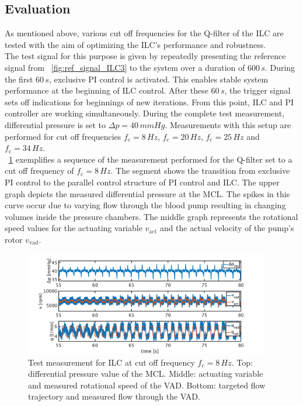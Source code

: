 \subsection{Evaluation}
As mentioned above, various cut off frequencies for the Q-filter of the ILC are tested with the aim of optimizing the ILC's performance and robustness.  \\The test signal for this purpose is given by repeatedly presenting the reference signal from \figurename~\ref{fig:ref_signal_ILC3} to the system over a duration of $600\,s$. During the first $60\,s$, exclusive PI control is activated. This enables stable system performance at the beginning of ILC control. After these $60\,s$, the trigger signal sets off indications for beginnings of new iterations. From this point, ILC and PI controller are working simultaneously. During the complete test measurement, differential pressure is set to $\Delta{p}=40\,mmHg$. Measurements with this setup are performed for cut off frequencies $f_{\mathrm{c}}=8\,Hz$, $f_{\mathrm{c}}=20\,Hz$, $f_{\mathrm{c}}=25\,Hz$ and $f_{\mathrm{c}}=34\,Hz$.
\\\figurename~\ref{fig:pi_to_ilc} exemplifies a sequence of the measurement performed for the Q-filter set to a cut off frequency of $f_{\mathrm{c}}=8\,Hz$. The segment shows the transition from exclusive PI control to the parallel control structure of PI control and ILC. The upper graph depicts the measured differential pressure at the MCL. The spikes in this curve occur due to varying flow through the blood pump resulting in changing volumes inside the pressure chambers. The middle graph represents the rotational speed values for the actuating variable $v_{\mathrm{act}}$ and the actual velocity of the pump's rotor $v_{\mathrm{vad}}$.
\begin{figure}[ht]
  \centering
  \includegraphics[width=0.95\textwidth]{images/chapt_5/ILC/pi_to_ilc_fc_8.pdf}
  \caption[Test measurement for ILC at cut off frequency $f_{\mathrm{c}}=8\,Hz$]{Test measurement for ILC at cut off frequency $f_{\mathrm{c}}=8\,Hz$.  Top: differential pressure value of the MCL. Middle: actuating variable and measured rotational speed of the VAD. Bottom: targeted flow trajectory and measured flow through the VAD.}
  \label{fig:pi_to_ilc}
\end{figure}

